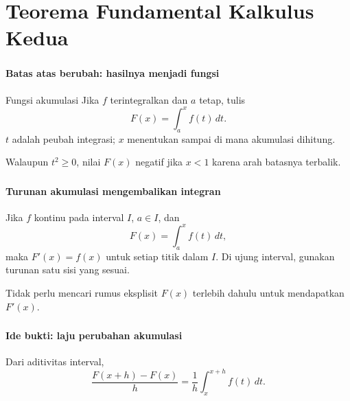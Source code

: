 \documentclass{../../kalkulus-ppt}
\begin{document}
\section{Teorema Fundamental Kalkulus Kedua}

\begin{frame}
\frametitle{\insertsection}
\framesubtitle{Batas atas berubah: hasilnya menjadi fungsi}

\begin{block}{Fungsi akumulasi}
Jika $f$ terintegralkan dan $a$ tetap, tulis
\[F(x)=\int_a^x f(t)\,dt.\]
$t$ adalah peubah integrasi; $x$ menentukan sampai di mana akumulasi dihitung.
\end{block}
Walaupun $t^2\ge0$, nilai $F(x)$ negatif jika $x<1$ karena arah batasnya terbalik.
\end{frame}

\begin{frame}
\frametitle{\insertsection}
\framesubtitle{Turunan akumulasi mengembalikan integran}

\begin{teorema}
Jika $f$ kontinu pada interval $I$, $a\in I$, dan
\[F(x)=\int_a^x f(t)\,dt,\]
maka $F'(x)=f(x)$ untuk setiap titik dalam $I$. Di ujung interval, gunakan turunan satu sisi yang sesuai.
\end{teorema}
Tidak perlu mencari rumus eksplisit $F(x)$ terlebih dahulu untuk mendapatkan $F'(x)$.
\end{frame}

\begin{frame}
\frametitle{\insertsection}
\framesubtitle{Ide bukti: laju perubahan akumulasi}

Dari aditivitas interval,
\[\frac{F(x+h)-F(x)}h=\frac1h\int_x^{x+h}f(t)\,dt.\]
\end{frame}
\end{document}
